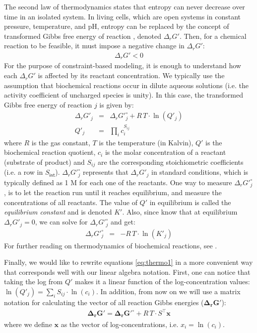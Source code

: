 \documentclass[10pt,a4paper]{article}
\newcommand{\mymatrix}[1]{#1}
\newcommand{\myvector}[1]{{\boldsymbol{#1}}}
\newcommand{\stoichmat}{\mymatrix{S}}
\newcommand{\stoichmatint}{\mymatrix{S}_{\mathsf{int}}}
\begin{document}
The second law of thermodynamics states that entropy can never decrease over time in an isolated system. In living cells, which are open systems in constant pressure, temperature, and pH, entropy can be replaced by the concept of transformed Gibbs free energy of reaction \cite{alberty_biochemical_2006-1}, denoted $\Delta_r G'$. Then, for a chemical reaction to be feasible, it must impose a negative change in $\Delta_r G'$:
\begin{eqnarray}
\Delta_r G' < 0
\end{eqnarray}
For the purpose of constraint-based modeling, it is enough to understand how each $\Delta_r G'$ is affected by its reactant concentration. We typically use the assumption that biochemical reactions occur in dilute aqueous solutions (i.e. the activity coefficient of uncharged species is unity). In this case, the transformed Gibbs free energy of reaction $j$ is given by:
\begin{eqnarray}\label{eq:thermo1}
\Delta_r G'_j &=& \Delta_r G'^\circ_j + R\,T\cdot\ln(Q'_j) \\
Q'_j &=& \prod_i c_i^{S_{ij}}
\end{eqnarray}
where $R$ is the gas constant, $T$ is the temperature (in Kalvin), $Q'$ is the biochemical reaction quotient, $c_i$ is the molar concentration of a reactant (substrate of product) and $S_{ij}$ are the corresponding stoichiometric coefficients (i.e. a row in $\stoichmatint$). $\Delta_r G'^\circ_j$ represents that $\Delta_r G'_j$ in standard conditions, which is typically defined as 1 M for each one of the reactants. One way to measure $\Delta_r G'^\circ_j$, is to let the reaction run until it reaches equilibrium, and measure the concentrations of all reactants. The value of $Q'$ in equilibrium is called the \textit{equilibrium constant} and is denoted $K'$. Also, since know that at equilibrium $\Delta_r G'_j = 0$, we can solve for $\Delta_r G'^\circ_j$ and get:
\begin{eqnarray}
\Delta_r G'^\circ_j &=& -R\,T\cdot\ln(K'_j)
\end{eqnarray}
For further reading on thermodynamics of biochemical reactions, see \cite{alberty_recommendations_2011, noor_note_2013}.


Finally, we would like to rewrite equations \ref{eq:thermo1} in a more convenient way that corresponds well with our linear algebra notation. First, one can notice that taking the log from $Q'$ makes it a linear function of the log-concentration values: $\ln(Q'_j) = \sum_i S_{ij} \cdot \ln(c_i)$. In addition, from now on we will use a matrix notation for calculating the vector of all reaction Gibbs energies ($\myvector{\Delta_r G'}$):
\begin{eqnarray}
\myvector{\Delta_r G'} = \myvector{\Delta_r G'^\circ} + R\,T\cdot\stoichmat^\top \myvector{x}
\end{eqnarray}
where we define $\myvector{x}$ as the vector of log-concentrations, i.e. $x_i = \ln(c_i)$.
\end{document}
